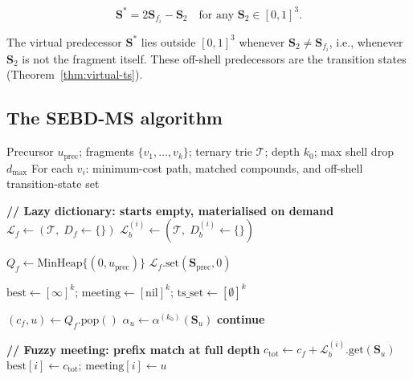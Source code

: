 \documentclass[twocolumn,10pt,a4paper]{article}
\theoremstyle{thmstyle}
\theoremstyle{definition}
\theoremstyle{remark}
\newcommand{\Sv}{\mathbf{S}}
\begin{document}
\begin{equation}
\Sv^* = 2\Sv_{f_i} - \Sv_2
\quad \text{for any } \Sv_2 \in [0,1]^3.
\label{eq:virtual-pred}
\end{equation}

The virtual predecessor $\Sv^*$ lies outside $[0,1]^3$ whenever
$\Sv_2 \neq \Sv_{f_i}$, i.e., whenever $\Sv_2$ is not the fragment
itself. These off-shell predecessors are the transition states
(Theorem~\ref{thm:virtual-ts}).

\subsection{The SEBD-MS algorithm}

\begin{algorithm}[t]
\caption{SEBD-MS with Lazy Ternary Dictionary}
\label{alg:sebd}
\begin{algorithmic}[1]
\Require Precursor $u_\text{prec}$; fragments $\{v_1,\ldots,v_k\}$;
         ternary trie $\mathcal{T}$; depth $k_0$; max shell drop $d_\text{max}$
\Ensure For each $v_i$: minimum-cost path, matched compounds,
         and off-shell transition-state set

\State \textbf{// Lazy dictionary: starts empty, materialised on demand}
\State $\mathcal{L}_f \gets (\mathcal{T},\; D_f \leftarrow \{\})$
  \State $\mathcal{L}_b^{(i)} \gets (\mathcal{T},\; D_b^{(i)} \leftarrow \{\})$
\EndFor

\State $Q_f \gets \text{MinHeap}\{(0, u_\text{prec})\}$
\State $\mathcal{L}_f.\text{set}(\Sv_\text{prec}, 0)$

\State $\text{best} \gets [\infty]^k$;\;
       $\text{meeting} \gets [\text{nil}]^k$;\;
       $\text{ts\_set} \gets [\emptyset]^k$

  \State $(c_f, u) \gets Q_f.\text{pop}()$
  \State $\alpha_u \gets \alpha^{(k_0)}(\Sv_u)$
  \If{$c_f > \mathcal{L}_f.\text{get}(\Sv_u)$} \textbf{continue} \EndIf

    \State \textbf{// Fuzzy meeting: prefix match at full depth}
    \If{$\mathcal{L}_b^{(i)}.\text{get}(\Sv_u) < \infty$}
      \State $c_\text{tot} \gets c_f + \mathcal{L}_b^{(i)}.\text{get}(\Sv_u)$
        \State $\text{best}[i] \gets c_\text{tot}$;\;
               $\text{meeting}[i] \gets u$
      \EndIf
    \EndIf
  \EndFor


\end{algorithmic}
\end{algorithm}
\end{document}

